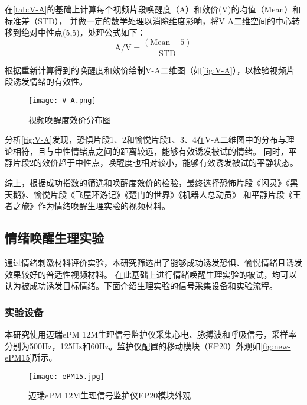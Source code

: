在\autoref{tab:V-A}的基础上计算每个视频片段唤醒度（A）和效价(V)的均值（Mean）和标准差（STD），
并做一定的数学处理以消除维度影响，将V-A二维空间的中心转移到绝对中性点(5,5)，处理公式如下：
\vspace{1ex}
\begin{equation}
    \label{equ:Mean}
    \text{A/V}= \frac{(\text{Mean}-5)}{\text{STD}}
\end{equation}

根据重新计算得到的唤醒度和效价绘制V-A二维图（如\autoref{fig:V-A}），以检验视频片段诱发情绪的有效性。  
\begin{figure}[htbp]
    \centering
    \vspace{-0.2em}
    \texttt{[image: V-A.png]}
    \caption[视频唤醒度效价分布图]{视频唤醒度效价分布图}{\label{fig:V-A}}
\end{figure}

分析\autoref{fig:V-A}发现，恐惧片段1、2和愉悦片段1、3、4在V-A二维图中的分布与理论相符，且与中性情绪点之间的距离较远，能够有效诱发被试的情绪。
同时，平静片段2的效价趋于中性点，唤醒度也相对较小，能够有效诱发被试的平静状态。

综上，根据成功指数的筛选和唤醒度效价的检验，最终选择恐怖片段《闪灵》《黑天鹅》、愉悦片段《飞屋环游记》《楚门的世界》《机器人总动员》
和平静片段《王者之旅》作为情绪唤醒生理实验的视频材料。

\subsection{情绪唤醒生理实验}
通过情绪刺激材料评价实验，本研究筛选出了能够成功诱发恐惧、愉悦情绪且诱发效果较好的普适性视频材料。
在此基础上进行情绪唤醒生理实验的被试，均可以认为被成功诱发目标情绪。下面介绍生理实验的信号采集设备和实验流程。

\subsubsection{实验设备}

本研究使用迈瑞ePM 12M生理信号监护仪采集心电、脉搏波和呼吸信号，采样率分别为500Hz，125Hz和60Hz。监护仪配置的移动模块（EP20）外观如\autoref{fig:new-ePM15}所示。
\begin{figure}[htbp]
    \centering
    \texttt{[image: ePM15.jpg]}
    \caption[迈瑞ePM 12M生理信号监护仪EP20模块外观]{迈瑞ePM 12M生理信号监护仪EP20模块外观}{\label{fig:new-ePM15}}
\end{figure}

